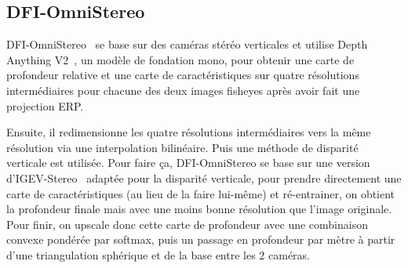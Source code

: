 \documentclass[11pt,a4paper]{article}
\begin{document}
\subsection{DFI-OmniStereo}
DFI-OmniStereo~\cite{endres2025dfiomnistereo} se base sur des caméras stéréo verticales et utilise Depth Anything V2~\cite{yang2024depth}, un modèle de fondation mono, pour obtenir une carte de profondeur relative et une carte de caractéristiques sur quatre résolutions intermédiaires pour chacune des deux images fisheyes après avoir fait une projection ERP.

Ensuite, il redimensionne les quatre résolutions intermédiaires vers la même résolution via une interpolation bilinéaire. Puis une méthode de disparité verticale est utilisée. Pour faire ça, DFI-OmniStereo se base sur une version d'IGEV-Stereo~\cite{xu2023iterative} adaptée pour la disparité verticale, pour prendre directement une carte de caractéristiques (au lieu de la faire lui-même) et ré-entrainer, on obtient la profondeur finale mais avec une moins bonne résolution que l'image originale.
Pour finir, on upscale donc cette carte de profondeur avec une combinaison convexe pondérée par softmax, puis un passage en profondeur par mètre à partir d'une triangulation sphérique et de la base entre les 2 caméras.

\begin{table}[htbp]
\centering
{}
\caption{Résultats DFI-OmniStereo}
\label{tab:dfi_results}
\end{table}
\end{document}
